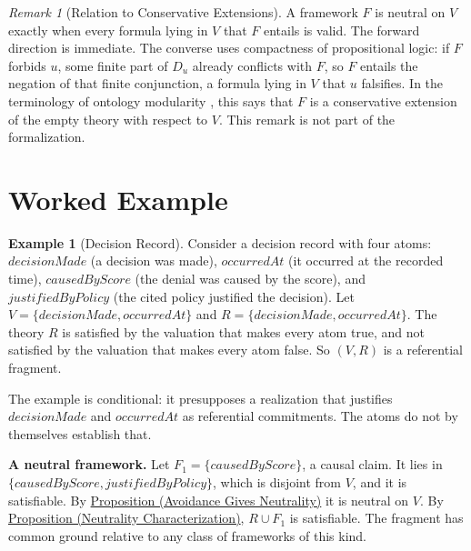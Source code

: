 \documentclass[11pt]{article}
\theoremstyle{plain}
\theoremstyle{definition}
\newtheorem{example}[theorem]{Example}
\theoremstyle{remark}
\newtheorem{remark}[theorem]{Remark}
\newcommand{\PropRef}[2]{\hyperref[#1]{Proposition (#2)}}
\newcommand{\Framework}{F}
\newcommand{\pred}[1]{\mathit{#1}}
\begin{document}
\begin{remark}[Relation to Conservative Extensions]
  \label{rem:conservative}
  A framework $\Framework$ is neutral on $V$ exactly when every formula lying
  in $V$ that $\Framework$ entails is valid.
  The forward direction is immediate.
  The converse uses compactness of propositional logic: if $\Framework$ forbids
  $u$, some finite part of $D_u$ already conflicts with $\Framework$, so
  $\Framework$ entails the negation of that finite conjunction, a formula
  lying in $V$ that $u$ falsifies.
  In the terminology of ontology modularity \citep{cuencagrau2008modular}, this
  says that $\Framework$ is a conservative extension of the empty theory with
  respect to $V$.
  This remark is not part of the formalization.
\end{remark}

\section{Worked Example}
\label{sec:example}

\begin{example}[Decision Record]
  \label{se110.example.DecisionRecord}
  Consider a decision record with four atoms:
  $\pred{decisionMade}$ (a decision was made),
  $\pred{occurredAt}$ (it occurred at the recorded time),
  $\pred{causedByScore}$ (the denial was caused by the score), and
  $\pred{justifiedByPolicy}$ (the cited policy justified the decision).
  Let $V = \{\pred{decisionMade}, \pred{occurredAt}\}$ and
  $R = \{\pred{decisionMade}, \pred{occurredAt}\}$.
  The theory $R$ is satisfied by the valuation that makes every atom true, and
  not satisfied by the valuation that makes every atom false.
  So $(V,R)$ is a referential fragment.
\end{example}

The example is conditional: it presupposes a realization that justifies
$\pred{decisionMade}$ and $\pred{occurredAt}$ as referential commitments.
The atoms do not by themselves establish that.

\textbf{A neutral framework.}
Let $\Framework_1 = \{\pred{causedByScore}\}$, a causal claim.
It lies in $\{\pred{causedByScore}, \pred{justifiedByPolicy}\}$, which is
disjoint from $V$, and it is satisfiable.
By \PropRef{se110.proposition.NeutralOnOfAvoids}{Avoidance Gives Neutrality}
it is neutral on $V$.
By \PropRef{se110.proposition.NeutralOnIffCompatible}{Neutrality
  Characterization}, $R \cup \Framework_1$ is satisfiable.
The fragment has common ground relative to any class of frameworks of this kind.
\end{document}
